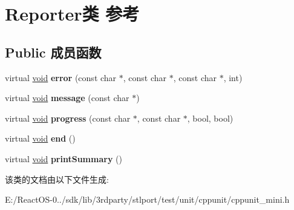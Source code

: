 \hypertarget{class_reporter}{}\section{Reporter类 参考}
\label{class_reporter}
\subsection*{Public 成员函数}
\begin{DoxyCompactItemize}
\item 
\mbox{\label{class_reporter_a3a0224f372ff32fe9cbe37442878786e}} 
virtual \hyperlink{interfacevoid}{void} {\bfseries error} (const char $\ast$, const char $\ast$, const char $\ast$, int)
\item 
\mbox{\label{class_reporter_a9a568a97c7e894b2b412c27c33327bc1}} 
virtual \hyperlink{interfacevoid}{void} {\bfseries message} (const char $\ast$)
\item 
\mbox{\label{class_reporter_acbeedb3a52c02fa3fab2e58db397d5ff}} 
virtual \hyperlink{interfacevoid}{void} {\bfseries progress} (const char $\ast$, const char $\ast$, bool, bool)
\item 
\mbox{\label{class_reporter_a50d0b18bb6af9dc5c815d5a3e0e05a29}} 
virtual \hyperlink{interfacevoid}{void} {\bfseries end} ()
\item 
\mbox{\label{class_reporter_a824e1a7207875c65319545fb7de5f2a6}} 
virtual \hyperlink{interfacevoid}{void} {\bfseries print\+Summary} ()
\end{DoxyCompactItemize}


该类的文档由以下文件生成\+:\begin{DoxyCompactItemize}
\item 
E\+:/\+React\+O\+S-\/0../sdk/lib/3rdparty/stlport/test/unit/cppunit/cppunit\+\_\+mini.\+h\end{DoxyCompactItemize}
